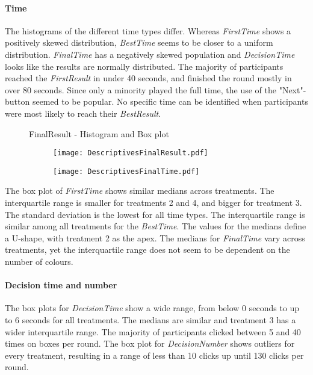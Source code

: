 \paragraph{Time}
\label{ch:Evaluation:sec:DescriptiveStatistics:subsec:Time}
The histograms of the different time types differ. Whereas \textit{FirstTime} shows a positively skewed distribution, \textit{BestTime} seems to be closer to a uniform distribution. \textit{FinalTime} has a negatively skewed population and \textit{DecisionTime} looks like the results are normally distributed. The majority of participants reached the \textit{FirstResult} in under 40 seconds, and finished the round mostly in over 80 seconds. Since only a minority played the full time, the use of the "Next"-button seemed to be popular. No specific time can be identified when participants were most likely to reach their \textit{BestResult}.
\begin{figure}[H] %
\begin{center}
  \caption{FinalResult - Histogram and Box plot}
    \label{DistributionFinalResult} 
\begin{subfigure} 
\centering
  \texttt{[image: DescriptivesFinalResult.pdf]}
\end{subfigure} 
  \caption{FinalTime - Histogram and Box plot}
   \label{DistributionFinalTime} 
\begin{subfigure} 
\centering
 \texttt{[image: DescriptivesFinalTime.pdf]}
\end{subfigure} 
\end{center}
\end{figure}
The box plot of \textit{FirstTime} shows similar medians across treatments. The interquartile range is smaller for treatments 2 and 4, and bigger for treatment 3. The standard deviation is the lowest for all time types. The interquartile range is similar among all treatments for the \textit{BestTime}. The values for the medians define a U-shape, with treatment 2 as the apex. The medians for \textit{FinalTime} vary across treatments, yet the interquartile range does not seem to be dependent on the number of colours.

\paragraph{Decision time and number}
The box plots for \textit{DecisionTime} show a wide range, from below 0 seconds to up to 6 seconds for all treatments. The medians are similar and treatment 3 has a wider interquartile range. The majority of participants clicked between 5 and 40 times on boxes per round. The box plot for \textit{DecisionNumber} shows outliers for every treatment, resulting in a range of less than 10 clicks up until 130 clicks per round.

